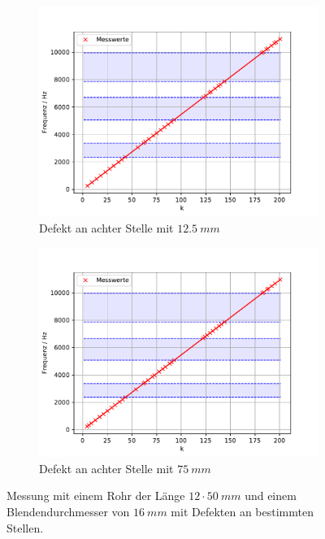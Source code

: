\begin{figure}
   \begin{subfigure}{0.48\textwidth}
    \centering
    \includegraphics[width=1.1\textwidth]{max3.pdf}
    \caption{Defekt an achter Stelle mit $\SI{12.5}{mm}$}
    \label{fig.Aufgabe123}
   \end{subfigure}
   \begin{subfigure}{0.48\textwidth}
    \centering
    \includegraphics[width=1.1\textwidth]{max4.pdf}
    \caption{Defekt an achter Stelle mit $\SI{75}{mm}$}
    \label{fig.Aufgabe124}
   \end{subfigure}
   \caption{Messung mit einem Rohr der Länge $12 \cdot \SI{50}{mm}$ und einem Blendendurchmesser von $\SI{16}{mm}$ mit Defekten an bestimmten Stellen.}
   \label{fig.Aufgabe12}
  \end{figure}
